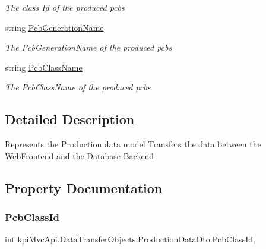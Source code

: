 \begin{DoxyCompactItemize}
\begin{DoxyCompactList}\small\item\em The class Id of the produced pcbs \end{DoxyCompactList}\item 
string \hyperlink{classkpi_mvc_api_1_1_data_transfer_objects_1_1_production_data_dto_ad77f639a55366cc0afda98890fe6fe01}{Pcb\+Generation\+Name}
\begin{DoxyCompactList}\small\item\em The Pcb\+Generation\+Name of the produced pcbs \end{DoxyCompactList}\item 
string \hyperlink{classkpi_mvc_api_1_1_data_transfer_objects_1_1_production_data_dto_a127f9fd37bef01ad74c1360377f505dd}{Pcb\+Class\+Name}
\begin{DoxyCompactList}\small\item\em The Pcb\+Class\+Name of the produced pcbs \end{DoxyCompactList}\end{DoxyCompactItemize}


\subsection{Detailed Description}
Represents the Production data model Transfers the data between the Web\+Frontend and the Database Backend 



\subsection{Property Documentation}
\mbox{\label{classkpi_mvc_api_1_1_data_transfer_objects_1_1_production_data_dto_a5f3110f6e0132a9e86e0aac45f624a2b}} 
\subsubsection{\texorpdfstring{Pcb\+Class\+Id}{PcbClassId}}
{\footnotesize\ttfamily int kpi\+Mvc\+Api.\+Data\+Transfer\+Objects.\+Production\+Data\+Dto.\+Pcb\+Class\+Id\hspace{0.3cm}{\ttfamily [get]}, {\ttfamily [set]}}



